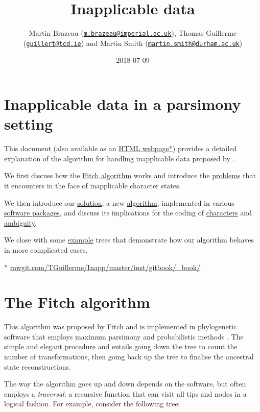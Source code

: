 \documentclass[]{book}
\title{Inapplicable data}
\author{Martin Brazeau
(\href{mailto:m.brazeau@imperial.ac.uk}{\nolinkurl{m.brazeau@imperial.ac.uk}}),
Thomas Guillerme
(\href{mailto:guillert@tcd.ie}{\nolinkurl{guillert@tcd.ie}}) and Martin
Smith
(\href{mailto:martin.smith@durham.ac.uk}{\nolinkurl{martin.smith@durham.ac.uk}})}
\date{2018-07-09}
\theoremstyle{definition}
\theoremstyle{definition}
\theoremstyle{definition}
\theoremstyle{remark}
\begin{document}
\maketitle

{
\setcounter{tocdepth}{1}
\tableofcontents
}
\chapter*{Inapplicable data in a parsimony
setting}\label{inapplicable-data-in-a-parsimony-setting}

This document (also available as an
\href{https://rawgit.com/TGuillerme/Inapp/master/inst/gitbook/_book/index.html}{HTML
webpage*}) provides a detailed explanation of the algorithm for handling
inapplicable data proposed by \citet{Brazeau2018}.

We first discuss how the \protect\hyperlink{fitch}{Fitch algorithm}
works and introduce the \protect\hyperlink{problems}{problems} that it
encounters in the face of inapplicable character states.

We then introduce our \protect\hyperlink{solution}{solution}, a new
\protect\hyperlink{algorithm}{algorithm}, implemented in various
\protect\hyperlink{software}{software packages}, and discuss its
implications for the coding of \protect\hyperlink{coding}{characters}
and \protect\hyperlink{ambiguity}{ambiguity}.

We close with some \protect\hyperlink{examples}{example} trees that
demonstrate how our algorithm behaves in more complicated cases.

*
\href{https://rawgit.com/TGuillerme/Inapp/master/inst/gitbook/_book/index.html}{rawgit.com/TGuillerme/Inapp/master/inst/gitbook/\_book/}

\hypertarget{fitch}{\chapter{The Fitch algorithm}\label{fitch}}

This algorithm was proposed by Fitch \citeyearpar{Fitch1971} and is
implemented in phylogenetic software that employs maximum parsimony
\citep{swofford2001paup, Goloboff2016} and probabilistic methods
\citep{Ronquist2012mrbayes, Stamatakis2014}. The simple and elegant
procedure and entails going down the tree to count the number of
transformations, then going back up the tree to finalise the ancestral
state reconstructions.

The way the algorithm goes up and down depends on the software, but
often employs a \emph{traversal}: a recursive function that can visit
all tips and nodes in a logical fashion. For example, consider the
following tree:
\end{document}
